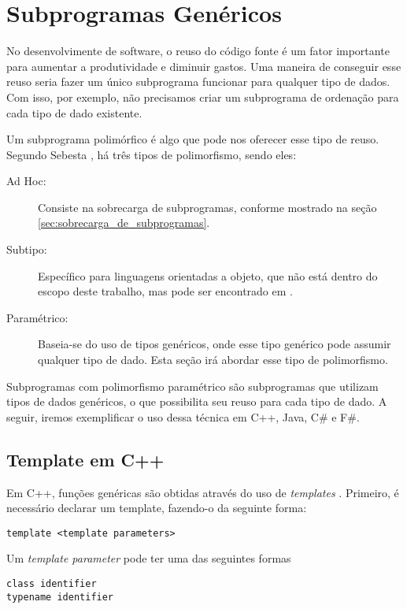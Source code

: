 \section{Subprogramas Genéricos} %
\label{sec:subprogramas_genericos}
No desenvolvimente de software, o reuso do código fonte é um fator importante para aumentar a produtividade e diminuir gastos. Uma maneira de conseguir esse reuso seria fazer um único subprograma funcionar para qualquer tipo de dados. Com isso, por exemplo, não precisamos criar um subprograma de ordenação para cada tipo de dado existente.

Um subprograma polimórfico é algo que pode nos oferecer esse tipo de reuso. Segundo Sebesta \cite{sebesta}, há três tipos de polimorfismo, sendo eles:
\begin{description}
	\item[Ad Hoc:] Consiste na sobrecarga de subprogramas, conforme mostrado na seção \ref{sec:sobrecarga_de_subprogramas}.
	\item[Subtipo:] Específico para linguagens orientadas a objeto, que não está dentro do escopo deste trabalho, mas pode ser encontrado em \cite{poli_java}.
	\item[Paramétrico:] Baseia-se do uso de tipos genéricos, onde esse tipo genérico pode assumir qualquer tipo de dado. Esta seção irá abordar esse tipo de polimorfismo.
\end{description}

Subprogramas com polimorfismo paramétrico são subprogramas que utilizam tipos de dados genéricos, o que possibilita seu reuso para cada tipo de dado. A seguir, iremos exemplificar o uso dessa técnica em C++, Java, C\# e F\#.

\subsection{Template em C++} %
\label{sub:template_em_c}
Em C++, funções genéricas são obtidas através do uso de \emph{templates} \cite{template_cpluplus}. Primeiro, é necessário declarar um template, fazendo-o da seguinte forma:
\begin{verbatim}
template <template parameters>
\end{verbatim}

Um \emph{template parameter} pode ter uma das seguintes formas
\begin{verbatim}
class identifier
typename identifier
\end{verbatim}

